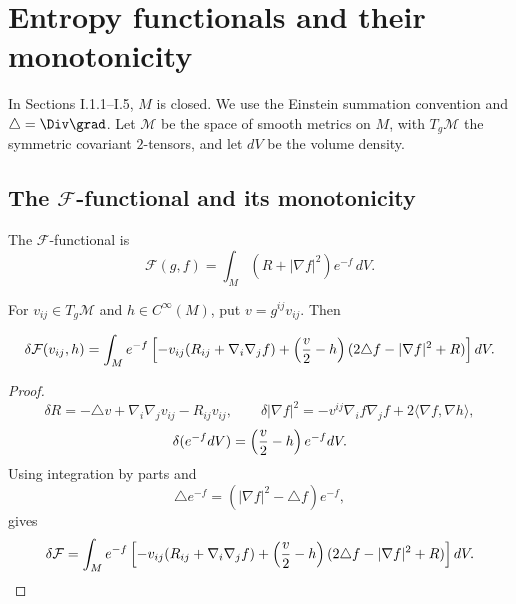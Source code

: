 \section{Entropy functionals and their monotonicity}

In Sections I.1.1--I.5, $M$ is closed. We use the Einstein summation
convention and $\triangle=\Div\grad$. Let ${\mathcal M}$ be the space of
smooth metrics on $M$, with $T_g{\mathcal M}$ the symmetric covariant
$2$-tensors, and let $dV$ be the volume density.

\subsection{The ${\mathcal F}$-functional and its monotonicity} \label{I.1.1}
\label{Derivation of first equation of Section 1.1}

\begin{definition}
  \label{def:kl-f-entropy-f-entropy-definition}
The ${\mathcal F}$-functional is
\begin{equation}
{\mathcal F}(g,f)=\int_M(R+|\nabla f|^2)e^{-f}\,dV.
\end{equation}
\end{definition}

For $v_{ij}\in T_g{\mathcal M}$ and $h\in C^\infty(M)$, put
$v=g^{ij}v_{ij}$. Then
\begin{proposition}
  \label{prop:kl-f-entropy-first-variation-f-entropy}
\begin{equation}
\delta {\mathcal F}(v_{ij},h)=\int_Me^{-f}\left[-v_{ij}(R_{ij}+\nabla_i\nabla_jf)
+\left({v\over2}-h\right)(2\triangle f-|\nabla f|^2+R)\right]dV.
\end{equation}
\end{proposition}
\begin{proof}
\sketch
\begin{equation}
\delta R=-\triangle v+\nabla_i\nabla_jv_{ij}-R_{ij}v_{ij},\qquad
\delta|\nabla f|^2=-v^{ij}\nabla_if\nabla_jf+2\langle\nabla f,\nabla h\rangle,
\end{equation}
\begin{equation}\label{measvar}
\delta(e^{-f}dV)=\left({v\over2}-h\right)e^{-f}dV.
\end{equation}
Using integration by parts and
\begin{equation}\label{id}
\triangle e^{-f}=(|\nabla f|^2-\triangle f)e^{-f},
\end{equation}
gives
\begin{equation}\label{Fvariation}
\delta {\mathcal F}=\int_Me^{-f}\left[-v_{ij}(R_{ij}+\nabla_i\nabla_jf)
+\left({v\over2}-h\right)(2\triangle f-|\nabla f|^2+R)\right]dV.
\end{equation}
\end{proof}

